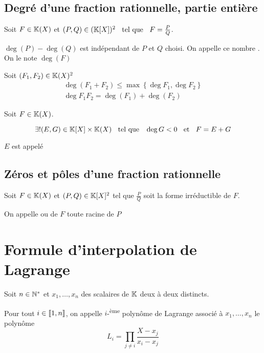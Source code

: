 \subsection{Degré d'une fraction rationnelle, partie entière}

\begin{dfn}
  Soit $F \in \mathbb{K}(X)$ et $(P, Q) \in (\mathbb{K}[X])^2 \;\;\text{ tel que }\;\; F = \frac{P}{Q}$.

  $\deg(P) - \deg(Q)$ est indépendant de $P$ et $Q$ choisi. On appelle
  ce nombre . On le note $\deg(F)$
\end{dfn}

\begin{prp}
  Soit $(F_1, F_2) \in \mathbb{K}(X)^2$
  \begin{gather*}
    \deg(F_1 + F_2) \leq \max\left\{\deg F_1, \deg F_2 \right\} \\
    \deg F_1 F_2 = \deg (F_1) + \deg (F_2)
  \end{gather*}
\end{prp}

\begin{prp}
  Soit $F \in \mathbb{K}(X)$.

  \[
    \exists! (E, G) \in \mathbb{K}[X] \times \mathbb{K}(X) \;\;\text{ tel que }\;\; \deg G < 0 \;\;\text{ et }\;\; F = E + G
  \]

  $E$ est appelé 
\end{prp}

\subsection{Zéros et pôles d'une fraction rationnelle}

\begin{dfn}
  Soit $F \in \mathbb{K}(X)$ et $(P, Q) \in \mathbb{K}[X]^2$ tel que $\frac{P}{Q}$
  soit la forme irréductible de $F$.

  On appelle  ou  de $F$ toute racine de $P$
\end{dfn}

\section{Formule d'interpolation de Lagrange}

\begin{dfn}
Soit $n \in \mathbb{N}^*$ et $x_1, \ldots, x_n$ des scalaires de $\mathbb{K}$ deux à deux
distincts.

Pour tout $i \in \llbracket 1, n \rrbracket$, on appelle $i$-\textsuperscript{ème}
polynôme de Lagrange associé à $x_1, \ldots, x_n$ le polynôme
\[
    L_i = \prod_{j \neq i} \frac{X - x_j}{x_i - x_j}
\]
\end{dfn}


